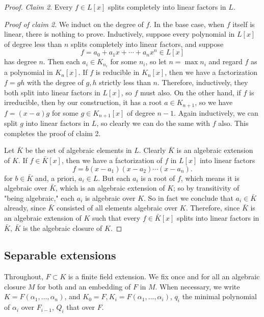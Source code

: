 \begin{proof}
\emph{Claim 2}. Every $ f \in L[x]$ splits completely into linear factors in $ L$.

\emph{Proof of claim 2}. We induct on the degree of $ f$. In the base case, when $ f$ itself is linear, there is nothing to prove. Inductively, suppose every polynomial in $ L[x]$ of degree less than $ n$ splits completely into linear factors, and suppose
\[ f = a_0 + a_1x + \dotsb + a_nx^n \in L[x] \]
has degree $ n$. Then each $ a_i \in K_{n_i}$ for some $ n_i$, so let $ n = \max n_i$ and regard $ f$ as a polynomial in $ K_n[x]$. If $ f$ is reducible in $ K_n[x]$, then we have a factorization $ f = gh$ with the degree of $ g, h$ strictly less than $ n$. Therefore, inductively, they both split into linear factors in $ L[x]$, so $ f$ must also. On the other hand, if $ f$ is irreducible, then by our construction, it has a root $ a\in K_{n+1}$, so we have $ f = (x - a) g$ for some $ g \in K_{n+1}[x]$ of degree $ n - 1$. Again inductively, we can split $ g$ into linear factors in $ L$, so clearly we can do the same with $ f$ also. This completes the proof of claim 2.

Let $ \bar{K}$ be the set of algebraic elements in $ L$. Clearly $ \bar{K}$ is an algebraic extension of $ K$. If $ f \in \bar{K}[x]$, then we have a factorization of $ f$ in $ L[x]$ into linear factors
\[ f = b(x - a_1)(x - a_2) \dotsb (x - a_n). \]
for $ b \in \bar{K}$ and, a priori, $ a_i \in L$. But each $ a_i$ is a root of $ f$, which means it is algebraic over $ \bar{K}$, which is an algebraic extension of $ K$; so by transitivity of "being algebraic," each $ a_i$ is algebraic over $ K$. So in fact we conclude that $ a_i \in \bar{K}$ already, since $ \bar{K}$ consisted of all elements algebraic over $ K$. Therefore, since $ \bar{K}$ is an algebraic extension of $ K$ such that every $ f \in \bar{K}[x]$ splits into linear factors in $ \bar{K}$, $ \bar{K}$ is the algebraic closure of $ K$.

\end{proof}


\subsection{Separable extensions}
Throughout, $F \subset K$ is a finite field extension.  We fix once and for
all an algebraic closure $M$ for both and an embedding of $F$ in $M$.  When
necessary, we write $K = F(\alpha_1, \dots, \alpha_n)$, and $K_0 = F, K_i =
F(\alpha_1, \dots, \alpha_i)$, $q_i$ the minimal polynomial of $\alpha_i$ over
$F_{i - 1}$, $Q_i$ that over $F$.

